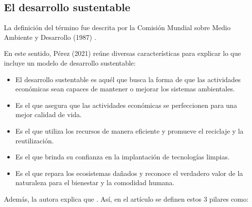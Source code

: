 {\setlength{\parskip}{0cm}
\subsection{El desarrollo sustentable}

La definición del término fue descrita por la Comisión Mundial sobre Medio Ambiente y Desarrollo (1987) .
}

En este sentido, Pérez (2021) reúne diversas características para explicar lo que incluye un modelo de desarrollo sustentable:

\begin{itemize}
    \item El desarrollo sustentable es aquél que busca la forma de que las actividades económicas sean capaces de mantener o mejorar los sistemas ambientales.
    
    \item Es el que asegura que las actividades económicas se perfeccionen para una mejor calidad de vida.
    
    \item Es el que utiliza los recursos de manera eficiente y promueve el reciclaje y la reutilización.
    
    \item Es el que brinda su confianza en la implantación de tecnologías limpias.
    
    \item Es el que repara los ecosistemas dañados y reconoce el verdadero valor de la naturaleza para el bienestar y la comodidad humana.
\end{itemize}

Además, la autora explica que . Así, en el artículo se definen estos 3 pilares como:

